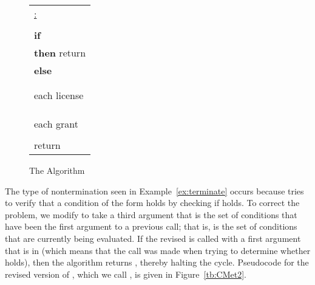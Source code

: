 \documentclass{acmtrans2m}
\newcommand{\<}{
}
\renewcommand{\>}{\rangle}
\newcommand{\vtab}{\phantom{Le}}
\begin{document}
\begin{figure*}[htb]
\begin{center}
\begin{tabular}{|l|}\hline
\underline{:}\\\\
{\bf if} \\
{\bf then} return \\
{\bf else}\\
\vtab \\
\vtab \\
\vtab {\bf for} each license \\
\vtab\vtab {\bf if} \\
\vtab\vtab {\bf then} \\
\vtab \\
\vtab{\bf for} each grant \\
\vtab\vtab \\
\vtab return \\
\hline
\end{tabular}
\end{center}
\caption{The  Algorithm}
\label{tb:auth2}
\end{figure*}

The type of nontermination seen in Example~\ref{ex:terminate} occurs because  tries to verify
that a condition of the form  holds by checking if  holds.  To correct
the problem, we modify  to take a third argument  that is the set of  conditions that
have been the first argument to a previous call; that is,  is the set of  conditions that
are currently being evaluated.  If the revised  is called with a first argument  that is
in  (which means that the call was made when trying to determine whether  holds), then the
algorithm returns , thereby halting the cycle.  Pseudocode for the revised version of ,
which we call , is given in Figure~\ref{tb:CMet2}.
\end{document}
